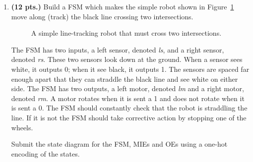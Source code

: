 \begin{enumerate}
\begin{solution}
{}\end{solution}

\item {\bf (12 pts.)}
\label{item:robot}
Build a FSM which makes the simple robot shown in Figure~\ref{fig:Robot}
move along (track) the black line crossing two intersections.
\begin{figure}[ht]
\caption{A simple line-tracking robot that must cross two intersections.}
\label{fig:Robot}
\end{figure}

The FSM has two inputs, a left sensor, denoted {\it ls}, and a right 
sensor, denoted {\it rs}.  These two sensors look down at the ground.  
When a sensor sees white, it outputs 0; when it see black, it outputs 1.  
The sensors are spaced far enough apart that they can straddle the black 
line and see white on either side.  The FSM has two outputs, a left
motor, denoted {\it lm} and a right motor, denoted {\it rm}.  A motor
rotates when it is sent a 1 and does not rotate when it is sent a 0.
The FSM should constantly check that the robot is straddling the line.
If it is not the FSM should take corrective action by stopping one of
the wheels.

Submit the state diagram for the FSM,  MIEs and OEs using 
a one-hot encoding of the states.


\end{enumerate}
